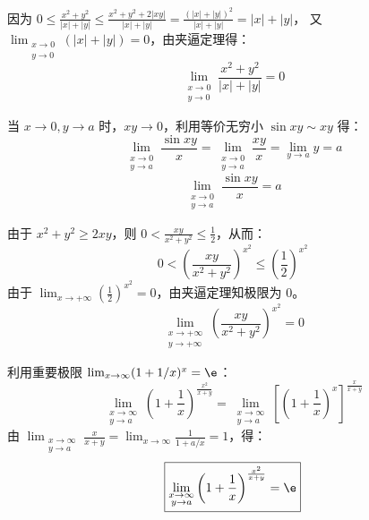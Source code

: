 \begin{solution}
    因为 $0 \le \frac{x^2 + y^2}{|x| + |y|} \le \frac{x^2 + y^2 + 2|xy|}{|x| + |y|} = \frac{(|x| + |y|)^2}{|x| + |y|} = |x| + |y|$，
    又 $\lim_{\substack{x \to 0 \\ y \to 0}} (|x| + |y|) = 0$，由夹逼定理得：
    \begin{equation}
        \boxed{\lim_{\substack{x \to 0 \\ y \to 0}} \frac{x^2 + y^2}{|x| + |y|} = 0}
    \end{equation}

    当 $x \to 0, y \to a$ 时，$xy \to 0$，利用等价无穷小 $\sin xy \sim xy$ 得：
    \begin{equation}
        \lim_{\substack{x \to 0 \\ y \to a}} \frac{\sin xy}{x} = \lim_{\substack{x \to 0 \\ y \to a}} \frac{xy}{x} = \lim_{y \to a} y = a
    \end{equation}
    \begin{equation}
        \boxed{\lim_{\substack{x \to 0 \\ y \to a}} \frac{\sin xy}{x} = a}
    \end{equation}

    由于 $x^2 + y^2 \ge 2xy$，则 $0 < \frac{xy}{x^2 + y^2} \le \frac{1}{2}$，从而：
    \begin{equation}
        0 < \left( \frac{xy}{x^2 + y^2} \right)^{x^2} \le \left( \frac{1}{2} \right)^{x^2}
    \end{equation}
    由于 $\lim_{x \to +\infty} \left( \frac{1}{2} \right)^{x^2} = 0$，由夹逼定理知极限为 $0$。
    \begin{equation}
        \boxed{\lim_{\substack{x \to +\infty \\ y \to +\infty}} \left( \frac{xy}{x^2 + y^2} \right)^{x^2} = 0}
    \end{equation}

    利用重要极限 $\lim_{x \to \infty} (1 + 1/x)^x = \e$：
    \begin{equation}
        \lim_{\substack{x \to \infty \\ y \to a}} \left( 1 + \frac{1}{x} \right)^{\frac{x^2}{x+y}} = \lim_{\substack{x \to \infty \\ y \to a}} \left[ \left( 1 + \frac{1}{x} \right)^x \right]^{\frac{x}{x+y}}
    \end{equation}
    由 $\lim_{\substack{x \to \infty \\ y \to a}} \frac{x}{x+y} = \lim_{x \to \infty} \frac{1}{1 + a/x} = 1$，得：
    \begin{equation}
        \boxed{\lim_{\substack{x \to \infty \\ y \to a}} \left( 1 + \frac{1}{x} \right)^{\frac{x^2}{x+y}} = \e}
    \end{equation}


\end{solution}
